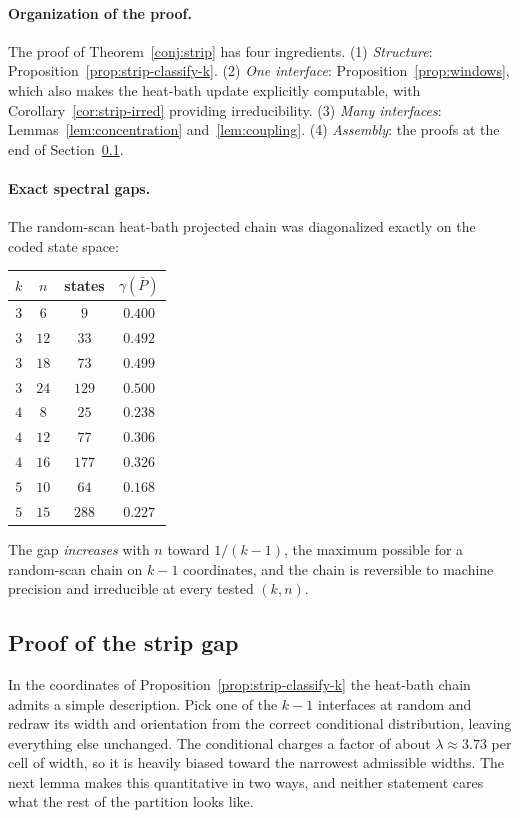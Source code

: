 \documentclass[11pt]{article}
\begin{document}
\paragraph{Organization of the proof.} The proof of
Theorem~\ref{conj:strip} has four ingredients. (1) \emph{Structure}:
Proposition~\ref{prop:strip-classify-k}. (2) \emph{One interface}:
Proposition~\ref{prop:windows}, which also makes the heat-bath update
explicitly computable, with Corollary~\ref{cor:strip-irred} providing
irreducibility. (3) \emph{Many
interfaces}: Lemmas~\ref{lem:concentration} and~\ref{lem:coupling}. (4)
\emph{Assembly}: the proofs at the end of
Section~\ref{subsec:coupling}.

\paragraph{Exact spectral gaps.} The random-scan heat-bath projected
chain was diagonalized exactly on the coded state space:
\begin{center}
\begin{tabular}{cccc}
\hline
$k$ & $n$ & states & $\gamma(\bar P)$ \\
\hline
$3$ & $6$  & $9$   & $0.400$ \\
$3$ & $12$ & $33$  & $0.492$ \\
$3$ & $18$ & $73$  & $0.499$ \\
$3$ & $24$ & $129$ & $0.500$ \\
$4$ & $8$  & $25$  & $0.238$ \\
$4$ & $12$ & $77$  & $0.306$ \\
$4$ & $16$ & $177$ & $0.326$ \\
$5$ & $10$ & $64$  & $0.168$ \\
$5$ & $15$ & $288$ & $0.227$ \\
\hline
\end{tabular}
\end{center}
The gap \emph{increases} with $n$ toward $1/(k-1)$, the maximum
possible for a random-scan chain on $k-1$ coordinates, and the chain is
reversible to machine precision and irreducible at every tested
$(k, n)$.

\subsection{Proof of the strip gap}
\label{subsec:coupling}

In the coordinates of Proposition~\ref{prop:strip-classify-k} the
heat-bath chain admits a simple description. Pick one of the $k-1$
interfaces at random and redraw its width and orientation from the
correct conditional distribution, leaving everything else unchanged. The
conditional charges a factor of about $\lambda \approx 3.73$ per cell of
width, so it is heavily biased toward the narrowest admissible widths.
The next lemma makes this quantitative in two ways, and neither
statement cares what the rest of the partition looks like.
\end{document}
